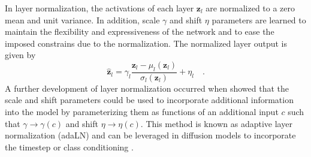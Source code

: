 In layer normalization, the activations of each layer $\mathbf{z}_{l}$ are normalized to a zero mean and unit variance. In addition, scale $\gamma$ and shift $\eta$ parameters are learned to maintain the flexibility and expressiveness of the network and to ease the imposed  constrains due to the normalization. The normalized layer output is given by 
\begin{equation}
	\hat{\mathbf{z}}_l = \gamma_l \frac{\mathbf{z}_l - \mu_l(\mathbf{z}_l)}{\sigma_l(\mathbf{z}_l)} + \eta_l \quad.
\end{equation}
A further development of layer normalization occurred when \cite{adaLN} showed that the scale and shift parameters could be used to incorporate additional information into the model by parameterizing them as functions of an additional input $c$ such that $\gamma \to \gamma(c)$ and shift $\eta \to \eta(c)$. This method is known as adaptive layer normalization (\gls{adaLN}) and can be leveraged in diffusion models to incorporate the timestep or class conditioning \cite{DiT}.
